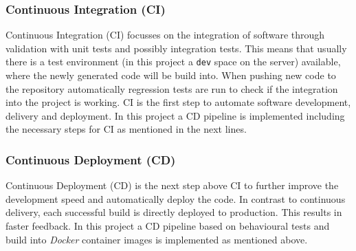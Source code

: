 \subsubsection{Continuous Integration (CI)}
\label{subsubsec:continuousintegration}
Continuous Integration (CI) focusses on the integration of software through validation with unit tests and possibly integration tests. This means that usually there is a test environment (in this project a \texttt{dev} space on the server) available, where the newly generated code will be build into. When pushing new code to the repository  automatically regression tests are run to check if the integration into the project is working. CI is the first step to automate software development, delivery and deployment. 
\newline\newline
In this project a CD pipeline is implemented including the necessary steps for CI as mentioned in the next lines. 

\subsubsection{Continuous Deployment (CD)}
\label{subsubsec:continuousdeployment}
Continuous Deployment (CD) is the next step above CI to further improve the development speed and automatically deploy the code. In contrast to continuous delivery, each successful build is directly deployed to production. This results in faster feedback. In this project a CD pipeline based on behavioural tests and build into \textit{Docker} container images is implemented as mentioned above.

